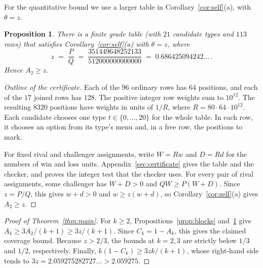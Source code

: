 \documentclass[11pt,letterpaper]{article}
\theoremstyle{cleanthm}
\newtheorem{proposition}[lemma]{Proposition}
\newcommand{\jointnum}{351449648252133}
\newcommand{\jointden}{512000000000000}
\begin{document}
For the quantitative bound we use a larger table in Corollary~\ref{cor:self}(a), with \(\theta=z\).

\begin{proposition}\label{prop:pair-z}
There is a finite grade table (with \(21\) candidate types and \(113\) rows) that satisfies
Corollary~\ref{cor:self}\textup{(a)} with \(\theta=z\), where
\[
 z \;=\; \frac{P}{Q} \;=\; \frac{\jointnum}{\jointden} \;=\; 0.686425094242\ldots\,.
\]
Hence \(A_2\ge z\).
\end{proposition}

\begin{proof}[Outline of the certificate]
Each of the \(96\) ordinary rows has \(64\) positions, and each of the \(17\) joined rows has \(128\).
The positive integer row weights sum to \(10^{12}\). The resulting \(8320\) positions have
weights in units of \(1/R\), where \(R=80\cdot64\cdot10^{12}\). Each candidate chooses one
type \(t\in\{0,\ldots,20\}\) for the whole table. In each row, it chooses an option from its
type's menu and, in a free row, the positions to mark.

For fixed rival and challenger assignments, write \(W=Rw\) and \(D=Rd\) for the numbers of
win and loss units. Appendix~\ref{sec:certificate} gives the table and the checker, and proves the
integer test that the checker uses. For every pair of rival assignments, some challenger has
\(W+D>0\) and \(QW\ge P(W+D)\). Since \(z=P/Q\), this gives \(w+d>0\) and \(w\ge z(w+d)\),
so Corollary~\ref{cor:self}(a) gives \(A_2\ge z\).
\end{proof}

\begin{proof}[Proof of Theorem~\ref{thm:main}]
For \(k\ge2\), Propositions~\ref{prop:blocks} and~\ref{prop:pair-z} give
\(A_k\ge 3A_2/(k+1)\ge 3z/(k+1)\). Since \(C_k=1-A_k\), this gives the claimed coverage bound.
Because \(z>2/3\), the bounds at \(k=2,3\) are strictly below \(1/3\) and \(1/2\), respectively.
Finally, \(k(1-C_k)\ge 3zk/(k+1)\), whose right-hand side tends to
\(3z=2.059275282727\ldots>2.059275\).
\end{proof}
\end{document}
